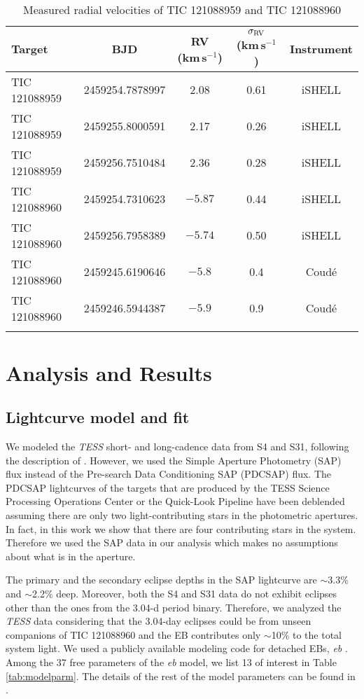 \documentclass[fleqn,usenatbib]{mnras} %
\begin{document}
\begin{table*}
\begin{center}
\caption{Measured radial velocities of TIC 121088959 and TIC 121088960}
\begin{tabular}{@{}l c c c c}
\hline
Target & BJD & RV (km\,s$^{-1}$) & $\sigma_{\rm RV}$ (km\,s$^{-1}$) & Instrument\\
\hline
TIC 121088959	&	2459254.7878997	&	2.08	&	0.61	&	iSHELL	\\
TIC 121088959	&	2459255.8000591	&	2.17	&	0.26	&	iSHELL	\\
TIC 121088959	&	2459256.7510484	&	2.36	&	0.28	&	iSHELL	\\
\hline
TIC 121088960	&	2459254.7310623	&	$-5.87$	&	0.44	&	iSHELL	\\
TIC 121088960	&	2459256.7958389	&	$-5.74$	&	0.50	&	iSHELL	\\
TIC 121088960   &   2459245.6190646 &  $ -5.8$    &   0.4     &   Coud{\'e}\\
TIC 121088960   &   2459246.5944387 &   $-5.9$    &   0.9     &   Coud{\'e} \\
\hline
\label{tab:rv}
\end{tabular}
\end{center}
\end{table*}


\section{Analysis and Results}
\label{sec:analysis}
\subsection{Lightcurve model and fit}

We modeled the {\em TESS} short- and long-cadence data from S4 and S31, following the description of \citet[][]{Han2017}. However, we used the Simple Aperture Photometry (SAP) flux instead of the Pre-search Data Conditioning SAP (PDCSAP) flux. The PDCSAP lightcurves of the targets that are produced by the TESS Science Processing Operations Center \citep[SPOC;][]{Jenkins2016} or the Quick-Look Pipeline \citep[QLP;][]{Huang2020} have been deblended assuming there are only two light-contributing stars in the photometric apertures. In fact, in this work we show that there are four contributing stars in the system.  Therefore we used the SAP data in our analysis which makes no assumptions about what is in the aperture.

The primary and the secondary eclipse depths in the SAP lightcurve are $\sim$3.3\% and $\sim$2.2\% deep. Moreover, both the S4 and S31 data do not exhibit eclipses other than the ones from the 3.04-d period binary. Therefore, we analyzed the {\em TESS} data considering that the 3.04-day eclipses could be from unseen companions of TIC 121088960 and the EB contributes only $\sim$10\% to the total system light. We used a publicly available modeling code for detached EBs, \textit{eb} \citep[][]{Irwin2011}. Among the 37 free parameters of the \textit{eb} model, we list 13 of interest in Table \ref{tab:modelparm}. The details of the rest of the model parameters can be found in \citet[][]{Irwin2011}.
\end{document}
